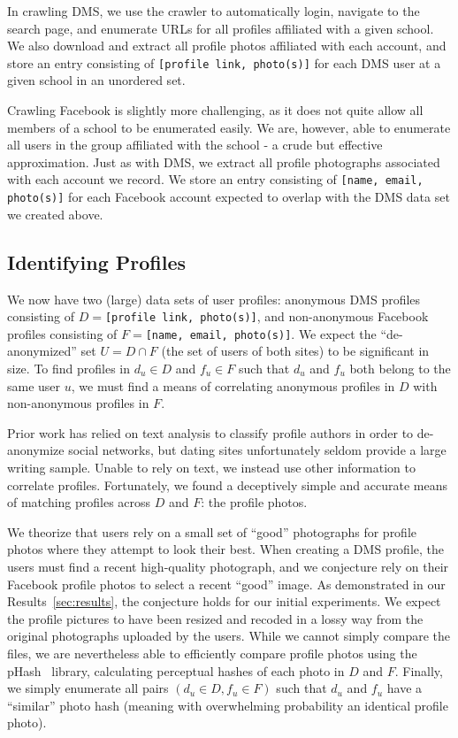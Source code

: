 In crawling DMS, we use the crawler to automatically login, navigate to the search page, and enumerate URLs for all profiles affiliated with a given school. We also download and extract all profile photos affiliated with each account, and store an entry consisting of \texttt{[profile link, photo(s)]} for each DMS user at a given school in an unordered set.

Crawling Facebook is slightly more challenging, as it does not quite allow all members of a school to be enumerated easily. We are, however, able to enumerate all users in the group affiliated with the school - a crude but effective approximation.
Just as with DMS, we extract all profile photographs associated with each account we record.
We store an entry consisting of \texttt{[name, email, photo(s)]} for each Facebook account expected to overlap with the DMS data set we created above.

\subsection{Identifying Profiles}
\label{sec:design_profile}

We now have two (large) data sets of user profiles: anonymous DMS profiles consisting of $D = $\texttt{[profile link, photo(s)]}, and non-anonymous Facebook profiles consisting of $F = $\texttt{[name, email, photo(s)]}.
We expect the ``de-anonymized'' set $U = D \cap F$  (the set of users of both sites) to be significant in size.
To find profiles in $d_u \in D$ and $f_u \in F$ such that $d_u$ and $f_u$ both belong to the same user $u$, we must find a means of correlating anonymous profiles in $D$ with non-anonymous profiles in $F$.

Prior work has relied on text analysis to classify profile authors in order to de-anonymize social networks, but dating sites unfortunately seldom provide a large writing sample.
Unable to rely on text, we instead use other information to correlate profiles.
Fortunately, we found a deceptively simple and accurate means of matching profiles across $D$ and $F$: the profile photos.

We theorize that users rely on a small set of ``good'' photographs for profile photos where they attempt to look their best.
When creating a DMS profile, the users must find a recent high-quality photograph, and we conjecture rely on their Facebook profile photos to select a recent ``good'' image.
As demonstrated in our Results~\ref{sec:results}, the conjecture holds for our initial experiments.
We expect the profile pictures to have been resized and recoded in a lossy way from the original photographs uploaded by the users.
While we cannot simply compare the files, we are nevertheless able to efficiently compare profile photos using the pHash~\cite{phash} library, calculating perceptual hashes of each photo in $D$ and $F$.
Finally, we simply enumerate all pairs $(d_u \in D, f_u \in F)$ such that $d_u$ and $f_u$ have a ``similar'' photo hash (meaning with overwhelming probability an identical profile photo).
